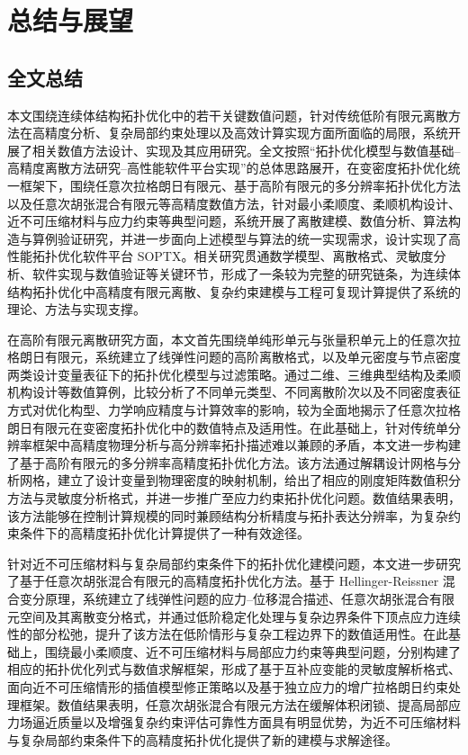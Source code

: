 \chapter{总结与展望}
\label{chap:summary_outlook}


\section{全文总结}
\label{sec:full_text_summary}

本文围绕连续体结构拓扑优化中的若干关键数值问题，针对传统低阶有限元离散方法在高精度分析、复杂局部约束处理以及高效计算实现方面所面临的局限，系统开展了相关数值方法设计、实现及其应用研究。全文按照“拓扑优化模型与数值基础--高精度离散方法研究--高性能软件平台实现”的总体思路展开，在变密度拓扑优化统一框架下，围绕任意次拉格朗日有限元、基于高阶有限元的多分辨率拓扑优化方法以及任意次胡张混合有限元等高精度数值方法，针对最小柔顺度、柔顺机构设计、近不可压缩材料与应力约束等典型问题，系统开展了离散建模、数值分析、算法构造与算例验证研究，并进一步面向上述模型与算法的统一实现需求，设计实现了高性能拓扑优化软件平台 SOPTX。相关研究贯通数学模型、离散格式、灵敏度分析、软件实现与数值验证等关键环节，形成了一条较为完整的研究链条，为连续体结构拓扑优化中高精度有限元离散、复杂约束建模与工程可复现计算提供了系统的理论、方法与实现支撑。

在高阶有限元离散研究方面，本文首先围绕单纯形单元与张量积单元上的任意次拉格朗日有限元，系统建立了线弹性问题的高阶离散格式，以及单元密度与节点密度两类设计变量表征下的拓扑优化模型与过滤策略。通过二维、三维典型结构及柔顺机构设计等数值算例，比较分析了不同单元类型、不同离散阶次以及不同密度表征方式对优化构型、力学响应精度与计算效率的影响，较为全面地揭示了任意次拉格朗日有限元在变密度拓扑优化中的数值特点及适用性。在此基础上，针对传统单分辨率框架中高精度物理分析与高分辨率拓扑描述难以兼顾的矛盾，本文进一步构建了基于高阶有限元的多分辨率高精度拓扑优化方法。该方法通过解耦设计网格与分析网格，建立了设计变量到物理密度的映射机制，给出了相应的刚度矩阵数值积分方法与灵敏度分析格式，并进一步推广至应力约束拓扑优化问题。数值结果表明，该方法能够在控制计算规模的同时兼顾结构分析精度与拓扑表达分辨率，为复杂约束条件下的高精度拓扑优化计算提供了一种有效途径。

针对近不可压缩材料与复杂局部约束条件下的拓扑优化建模问题，本文进一步研究了基于任意次胡张混合有限元的高精度拓扑优化方法。基于 Hellinger-Reissner 混合变分原理，系统建立了线弹性问题的应力--位移混合描述、任意次胡张混合有限元空间及其离散变分格式，并通过低阶稳定化处理与复杂边界条件下顶点应力连续性的部分松弛，提升了该方法在低阶情形与复杂工程边界下的数值适用性。在此基础上，围绕最小柔顺度、近不可压缩材料与局部应力约束等典型问题，分别构建了相应的拓扑优化列式与数值求解框架，形成了基于互补应变能的灵敏度解析格式、面向近不可压缩情形的插值模型修正策略以及基于独立应力的增广拉格朗日约束处理框架。数值结果表明，任意次胡张混合有限元方法在缓解体积闭锁、提高局部应力场逼近质量以及增强复杂约束评估可靠性方面具有明显优势，为近不可压缩材料与复杂局部约束条件下的高精度拓扑优化提供了新的建模与求解途径。

